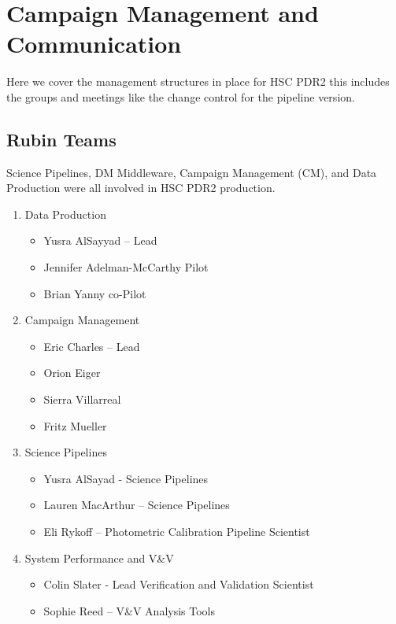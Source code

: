 \section{Campaign Management and Communication} \label{sec:management}

Here we cover the management structures in place for HSC PDR2 
this includes the groups and meetings like the change control for 
the pipeline version.

\subsection{Rubin Teams}

Science Pipelines, DM Middleware, Campaign Management (CM), and Data Production
were all involved in HSC PDR2 production.

\begin{enumerate}

\item Data Production


\begin{itemize}
\item Yusra AlSayyad -- Lead
\item Jennifer Adelman-McCarthy Pilot
\item Brian Yanny co-Pilot
\end{itemize}


\item Campaign Management

\begin{itemize}
\item Eric Charles -- Lead
\item Orion Eiger
\item Sierra Villarreal
\item Fritz Mueller
\end{itemize}

\item Science Pipelines

\begin{itemize}
\item Yusra AlSayad - Science Pipelines 
\item Lauren MacArthur -- Science Pipelines
\item Eli Rykoff -- Photometric Calibration Pipeline Scientist
\end{itemize}

\item System Performance and V\&V

\begin{itemize}
\item Colin Slater - Lead Verification and Validation Scientist
\item Sophie Reed -- V\&V Analysis Tools
\end{itemize}


\end{enumerate}
